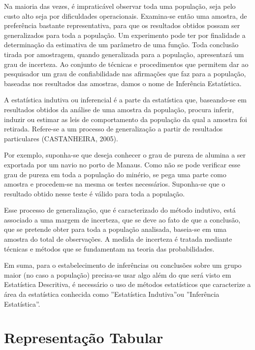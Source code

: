 \documentclass[
  letterpaper,
  DIV=11,
  numbers=noendperiod]{scrreprt}
\begin{document}
Na maioria das vezes, é impraticável observar toda uma população, seja
pelo custo alto seja por dificuldades operacionais. Examina-se então uma
amostra, de preferência bastante representativa, para que os resultados
obtidos possam ser generalizados para toda a população. Um experimento
pode ter por finalidade a determinação da estimativa de um parâmetro de
uma função. Toda conclusão tirada por amostragem, quando generalizada
para a população, apresentará um grau de incerteza. Ao conjunto de
técnicas e procedimentos que permitem dar ao pesquisador um grau de
confiabilidade nas afirmações que faz para a população, baseadas nos
resultados das amostras, damos o nome de Inferência Estatística.

A estatística indutiva ou inferencial é a parte da estatística que,
baseando-se em resultados obtidos da análise de uma amostra da
população, procura inferir, induzir ou estimar as leis de comportamento
da população da qual a amostra foi retirada. Refere-se a um processo de
generalização a partir de resultados particulares (CASTANHEIRA, 2005).

Por exemplo, suponha-se que deseja conhecer o grau de pureza de alumina
a ser exportada por um navio no porto de Manaus. Como não se pode
verificar esse grau de pureza em toda a população do minério, se pega
uma parte como amostra e procedem-se na mesma os testes necessários.
Suponha-se que o resultado obtido nesse teste é válido para toda a
população.

Esse processo de generalização, que é caracterizado do método indutivo,
está associado a uma margem de incerteza, que se deve ao fato de que a
conclusão, que se pretende obter para toda a população analisada,
baseia-se em uma amostra do total de observações. A medida de incerteza
é tratada mediante técnicas e métodos que se fundamentam na teoria das
probabilidades.

Em suma, para o estabelecimento de inferências ou conclusões sobre um
grupo maior (no caso a população) precisa-se usar algo além do que será
visto em Estatística Descritiva, é necessário o uso de métodos
estatísticos que caracterize a área da estatística conhecida como
''Estatística Indutiva''ou ''Inferência Estatística''.


\hypertarget{representauxe7uxe3o-tabular}{%
\chapter{Representação Tabular}\label{representauxe7uxe3o-tabular}}
\end{document}
